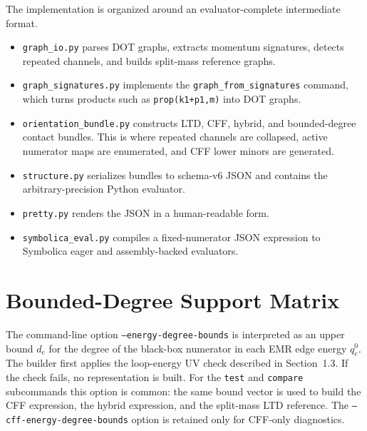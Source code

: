 \documentclass[11pt,a4paper]{report}
\begin{document}
The implementation is organized around an evaluator-complete intermediate
format.
\begin{itemize}[leftmargin=2em]
  \item \texttt{graph\_io.py} parses DOT graphs, extracts momentum signatures,
        detects repeated channels, and builds split-mass reference graphs.
  \item \texttt{graph\_signatures.py} implements the
        \texttt{graph\_from\_signatures} command, which turns products such as
        \texttt{prop(k1+p1,m)} into DOT graphs.
  \item \texttt{orientation\_bundle.py} constructs LTD, CFF, hybrid, and
        bounded-degree contact bundles.  This is where repeated channels are
        collapsed, active numerator maps are enumerated, and CFF lower minors
        are generated.
  \item \texttt{structure.py} serializes bundles to schema-v6 JSON and contains
        the arbitrary-precision Python evaluator.
  \item \texttt{pretty.py} renders the JSON in a human-readable form.
  \item \texttt{symbolica\_eval.py} compiles a fixed-numerator JSON expression
        to Symbolica eager and assembly-backed evaluators.
\end{itemize}

\section{Bounded-Degree Support Matrix}

The command-line option \texttt{--energy-degree-bounds} is interpreted as an
upper bound \(d_e\) for the degree of the black-box numerator in each EMR edge
energy \(q_e^0\).  The builder first applies the loop-energy UV check described
in Section~1.3.  If the check fails, no representation is built.
For the \texttt{test} and \texttt{compare} subcommands this option is common:
the same bound vector is used to build the CFF expression, the hybrid
expression, and the split-mass LTD reference.  The
\texttt{--cff-energy-degree-bounds} option is retained only for CFF-only
diagnostics.
\end{document}
